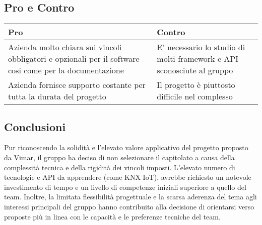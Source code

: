 \documentclass[a4paper,12pt]{article}
\begin{document}
{    \subsection*{Pro e Contro}{

        \begin{center} 
            \begin{tabular}{|p{9cm}|p{5cm}|}
                \hline
                \textbf{Pro} & \textbf{Contro} \\
                \hline
                Azienda molto chiara sui vincoli obbligatori e opzionali per il software cosi come per la documentazione
                & E' necessario lo studio di molti framework e API sconosciute al gruppo \\
                \hline
                Azienda fornisce supporto costante per tutta la durata del progetto & Il progetto è piuttosto difficile nel complesso\\
                \hline
            \end{tabular}
        \end{center}

    }

    \subsection*{Conclusioni}{
        Pur riconoscendo la solidità e l'elevato valore applicativo del progetto proposto da Vimar, il gruppo ha deciso di non selezionare il capitolato a causa della complessità tecnica e della rigidità dei vincoli imposti. L'elevato numero di tecnologie e API da apprendere (come KNX IoT), avrebbe richiesto un notevole investimento di tempo e un livello di competenze iniziali superiore a quello del team. Inoltre, la limitata flessibilità progettuale e la scarsa aderenza del tema agli interessi principali del gruppo hanno contribuito alla decisione di orientarsi verso proposte più in linea con le capacità e le preferenze tecniche del team.
    }
}
\end{document}
